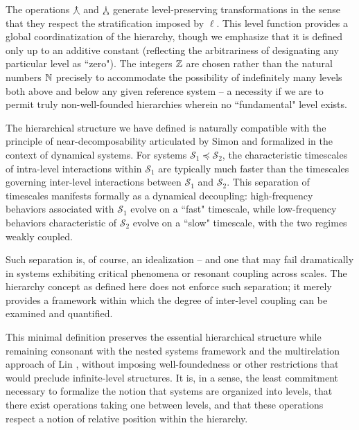 The operations $\operatorname*{\curlywedgeuparrow}$ and $\operatorname*{\curlywedgedownarrow}$ generate level-preserving transformations in the sense that they respect the stratification imposed by $\ell$. This level function provides a global coordinatization of the hierarchy, though we emphasize that it is defined only up to an additive constant (reflecting the arbitrariness of designating any particular level as ``zero"). The integers $\mathbb{Z}$ are chosen rather than the natural numbers $\mathbb{N}$ precisely to accommodate the possibility of indefinitely many levels both above and below any given reference system -- a necessity if we are to permit truly non-well-founded hierarchies wherein no ``fundamental" level exists.

\begin{remark}
The hierarchical structure we have defined is naturally compatible with the principle of near-decomposability articulated by Simon \cite{Simon2012} and formalized in the context of dynamical systems. For systems $\mathcal{S}_1 \preceq \mathcal{S}_2$, the characteristic timescales of intra-level interactions within $\mathcal{S}_1$ are typically much faster than the timescales governing inter-level interactions between $\mathcal{S}_1$ and $\mathcal{S}_2$. This separation of timescales manifests formally as a dynamical decoupling: high-frequency behaviors associated with $\mathcal{S}_1$ evolve on a ``fast" timescale, while low-frequency behaviors characteristic of $\mathcal{S}_2$ evolve on a ``slow" timescale, with the two regimes weakly coupled.

Such separation is, of course, an idealization -- and one that may fail dramatically in systems exhibiting critical phenomena or resonant coupling across scales. The hierarchy concept as defined here does not enforce such separation; it merely provides a framework within which the degree of inter-level coupling can be examined and quantified.
\end{remark}

This minimal definition preserves the essential hierarchical structure while remaining consonant with the nested systems framework and the multirelation approach of Lin \cite{Lin2002}, without imposing well-foundedness or other restrictions that would preclude infinite-level structures. It is, in a sense, the least commitment necessary to formalize the notion that systems are organized into levels, that there exist operations taking one between levels, and that these operations respect a notion of relative position within the hierarchy.

